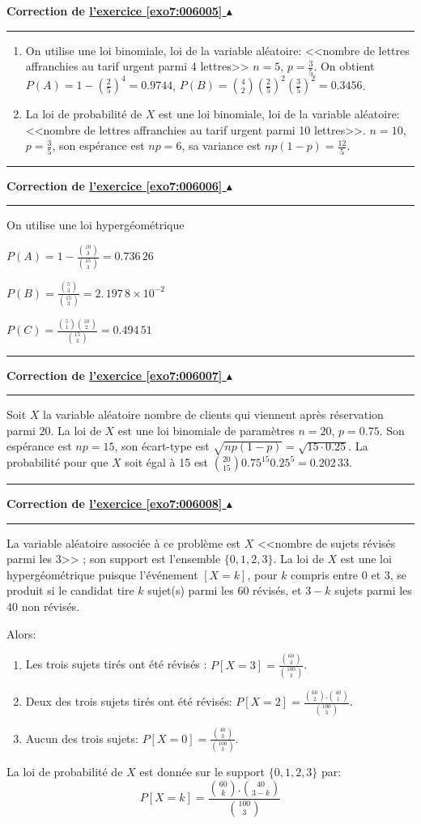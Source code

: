 \documentclass[11pt,a4paper]{article}
\newcounter{exo}
\newcommand{\correction}[1]{\hypertarget{cor7:#1}{}\label{cor7:#1}{\bf Correction de \hyperlink{exo7:#1}{l'exercice \ref{exo7:#1} $\blacktriangle$}}\vspace{1mm}\hrule\vspace{1mm}}
\newcommand{\fincorrection}{\vspace{1mm}\hrule\vspace*{7mm}}
\begin{document}
\newpage

\correction{006005}
\begin{enumerate}
\item On utilise une loi binomiale, loi de la variable aléatoire:
<<nombre de lettres affranchies au tarif urgent parmi 4 lettres>>
$n=5$, $p=\frac{3}{5}$. 
On obtient $P(A)=1-(\frac{2}{5})^{4}=0.9744$, 
$P(B)=\binom{4}{2}(\frac{2}{5})^{2}(\frac{3}{5})^{2}=0.3456$.

\item La loi de probabilité de $X$ est une loi binomiale, loi de la variable
aléatoire: <<nombre de lettres affranchies au tarif
urgent parmi 10 lettres>>.
$n=10$, $p=\frac{3}{5}$, son espérance est $np=6$, sa variance est $np(1-p)=\frac{12}{5}$.
\end{enumerate}
\fincorrection
\correction{006006}
On utilise une loi hypergéométrique

$P(A)=1-\frac{\binom{10}{3}}{\binom{15}{3}}=
0.736\,26$

$P(B)=\frac{\binom{5}{3}}{\binom{15}{3}}=2.\,
197\,8\times 10^{-2}$

$P(C)=\frac{\binom{5}{1}\binom{10}{2}}{\binom{15}{3}}=0.494\,51$
\fincorrection
\correction{006007}
Soit $X$ la variable aléatoire nombre de clients
qui viennent après réservation parmi 20.
La loi de $X$ est une loi binomiale de paramètres $n=20$, $p=0.75$.
Son espérance est $np=15$, son écart-type est $\sqrt{np(1-p)}=\sqrt{15\cdot 0.25}$.
La probabilité pour que $X$ soit égal à 15 est $\binom{20}{15}0.75^{15}0.25^{5}=0.202\,33$.
\fincorrection
\correction{006008}
La variable aléatoire associée à ce problème est $X$ 
<<nombre de sujets révisés parmi les $3$>> ; son support est l'ensemble
$\{0,1,2,3\}$. La loi de $X$ est une loi hypergéométrique puisque
l'événement $[X=k]$, pour $k$ compris entre $0$ et $3$, se produit si
le candidat tire $k$ sujet(s) parmi les $60$ révisés, et $3-k$ sujets
parmi les $40$ non révisés.

Alors:
\begin{enumerate}
\item Les trois sujets tirés ont été révisés : $P[X=3]=\frac{\binom{60}{3}}{\binom{100}{3}}$.
\item Deux des trois sujets tirés ont été révisés: $P[X=2]=\frac{\binom{60}{2}.\binom{40}{1}}{\binom{100}{3}}$.
\item Aucun des trois sujets: $P[X=0]=\frac{\binom{40}{3}}{\binom{100}{3}}$.
\end{enumerate}
La loi de probabilité de $X$ est donnée sur le support $\{0,1,2,3\}$ par:
\begin{equation*}
P[X=k]=\frac{\binom{60}{k}.\binom{40}{3-k}}{\binom{100}{3}}
\end{equation*}
\end{document}

